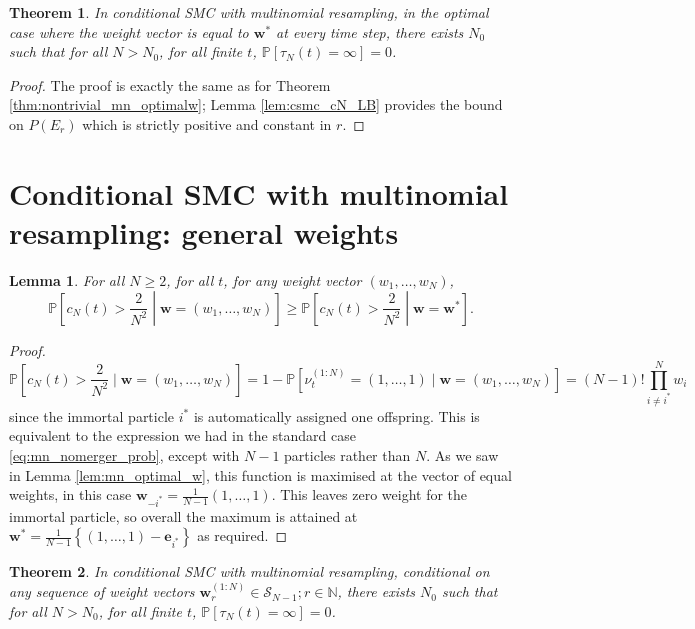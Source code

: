 \documentclass{article}
\newtheorem{thm}{Theorem}
\newtheorem{lemma}{Lemma}
\newcommand{\PR}{\mathbb{P}}
\begin{document}
\begin{thm}\label{thm:nontrivial_csmc_optimalw}
In conditional SMC with multinomial resampling, in the optimal case where the weight vector is equal to $\mathbf{w}^*$ at every time step, there exists $N_0$ such that for all $N>N_0$, for all finite $t$, $\PR[\tau_N(t) = \infty] =0$.
\end{thm}

\begin{proof}
The proof is exactly the same as for Theorem \ref{thm:nontrivial_mn_optimalw}; Lemma \ref{lem:csmc_cN_LB} provides the bound on $P(E_r)$ which is strictly positive and constant in $r$.
\end{proof}


\section*{Conditional SMC with multinomial resampling: general weights}

\begin{lemma}\label{lem:csmc_optimal_w}
For all $N\geq 2$, for all $t$, for any weight vector $(w_1, \dots, w_N)$,
\begin{equation*}
\PR \left[c_N(t) > \frac{2}{N^2} \middle| \mathbf{w}=(w_1, \dots, w_N) \right]
\geq \PR \left[c_N(t) > \frac{2}{N^2} \middle| \mathbf{w}=\mathbf{w}^* \right].
\end{equation*}
\end{lemma}

\begin{proof}
\begin{equation*}
\PR \left[c_N(t) > \frac{2}{N^2} \mid \mathbf{w}=(w_1, \dots, w_N) \right]
= 1- \PR[\nu_t^{(1:N)} = (1,\dots, 1) \mid \mathbf{w}=(w_1, \dots, w_N)] 
= (N-1)! \prod_{i\neq i^*}^{N} w_i
\end{equation*}
since the immortal particle $i^*$ is automatically assigned one offspring.
This is equivalent to the expression we had in the standard case \eqref{eq:mn_nomerger_prob}, except with $N-1$ particles rather than $N$. 
As we saw in Lemma \ref{lem:mn_optimal_w}, this function is maximised at the vector of equal weights, in this case $\mathbf{w}_{-i^*}=\frac{1}{N-1} (1,\dots,1)$. 
This leaves zero weight for the immortal particle, so overall the maximum is attained at $\mathbf{w}^*=\frac{1}{N-1} \left\{ (1,\dots,1) - \mathbf{e}_{i^*} \right\}$ as required.
\end{proof}

\begin{thm}
In conditional SMC with multinomial resampling, conditional on any sequence of weight vectors $\mathbf{w}_r^{(1:N)} \in \mathcal{S}_{N-1}; r\in\mathbb{N}$, there exists $N_0$ such that for all $N>N_0$, for all finite $t$, $\PR[\tau_N(t) = \infty] =0$.
\end{thm}
\end{document}
